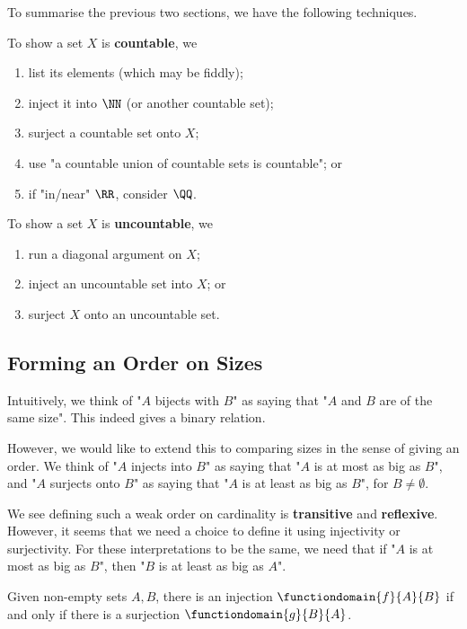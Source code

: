 To summarise the previous two sections, we have the following techniques.

To show a set \(X\) is \textbf{countable}, we
\begin{enumerate}
    \item list its elements (which may be fiddly);
    \item inject it into \(\NN\) (or another countable set);
    \item surject a countable set onto \(X\);
    \item use "a countable union of countable sets is countable"; or
    \item if "in/near" \(\RR\), consider \(\QQ\).
\end{enumerate}

To show a set \(X\) is \textbf{uncountable}, we
\begin{enumerate}
    \item run a diagonal argument on \(X\);
    \item inject an uncountable set into \(X\); or
    \item surject \(X\) onto an uncountable set.
\end{enumerate}

\subsection{Forming an Order on Sizes}
\label{sec:order-on-sizes}

Intuitively, we think of "\(A\) bijects with \(B\)" as saying that "\(A\) and \(B\) are of the same size". This indeed gives a binary relation.

However, we would like to extend this to comparing sizes in the sense of giving an order. We think of "\(A\) injects into \(B\)" as saying that "\(A\) is at most as big as \(B\)", and "\(A\) surjects onto \(B\)" as saying that "\(A\) is at least as big as \(B\)", for \(B \neq \emptyset\).

We see defining such a weak order on cardinality is \textbf{transitive} and \textbf{reflexive}. However, it seems that we need a choice to define it using injectivity or surjectivity. For these interpretations to be the same, we need that if "\(A\) is at most as big as \(B\)", then "\(B\) is at least as big as \(A\)".

\begin{lemma}
    Given non-empty sets \(A, B\), there is an injection \(\functiondomain{f}{A}{B}\) if and only if there is a surjection \(\functiondomain{g}{B}{A}\).
\end{lemma}

